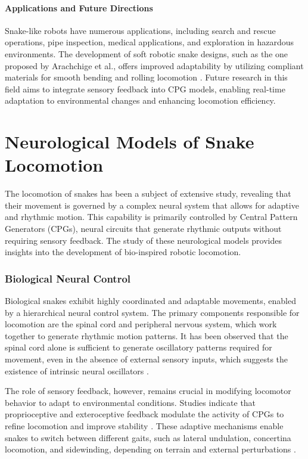 \documentclass[12pt,a4paper]{report}
\begin{document}
\paragraph{Applications and Future Directions}
Snake-like robots have numerous applications, including search and rescue operations, pipe inspection, medical applications, and exploration in hazardous environments. The development of soft robotic snake designs, such as the one proposed by Arachchige et al., offers improved adaptability by utilizing compliant materials for smooth bending and rolling locomotion \cite{Arachchige2021}. Future research in this field aims to integrate sensory feedback into CPG models, enabling real-time adaptation to environmental changes and enhancing locomotion efficiency.


\section{Neurological Models of Snake Locomotion}

The locomotion of snakes has been a subject of extensive study, revealing that their movement is governed by a complex neural system that allows for adaptive and rhythmic motion. This capability is primarily controlled by Central Pattern Generators (CPGs), neural circuits that generate rhythmic outputs without requiring sensory feedback. The study of these neurological models provides insights into the development of bio-inspired robotic locomotion.

\subsubsection{Biological Neural Control}

Biological snakes exhibit highly coordinated and adaptable movements, enabled by a hierarchical neural control system. The primary components responsible for locomotion are the spinal cord and peripheral nervous system, which work together to generate rhythmic motion patterns. It has been observed that the spinal cord alone is sufficient to generate oscillatory patterns required for movement, even in the absence of external sensory inputs, which suggests the existence of intrinsic neural oscillators \cite{Hirose2004}.

The role of sensory feedback, however, remains crucial in modifying locomotor behavior to adapt to environmental conditions. Studies indicate that proprioceptive and exteroceptive feedback modulate the activity of CPGs to refine locomotion and improve stability \cite{grillner2003motor}. These adaptive mechanisms enable snakes to switch between different gaits, such as lateral undulation, concertina locomotion, and sidewinding, depending on terrain and external perturbations \cite{transeth-2009}.
\end{document}
